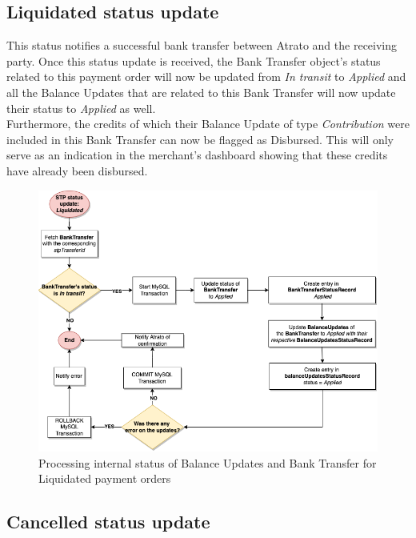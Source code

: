 \subsection{Liquidated status update}

This status notifies a successful bank transfer between Atrato and the receiving party. Once this status update is received, the Bank Transfer object’s status related to this payment order will now be updated from \textit{In transit} to \textit{Applied} and all the Balance Updates that are related to this Bank Transfer will now update their status to \textit{Applied} as well.\\

Furthermore, the credits of which their Balance Update of type \textit{Contribution} were included in this Bank Transfer can now be flagged as Disbursed. This will only serve as an indication in the merchant’s dashboard showing that these credits have already been disbursed.

\begin{figure} [H]
    \centering
    \includegraphics[scale = 0.4]{assets/diagrams/LiquidatedStatusUpdate.png}
    \caption{Processing internal status of Balance Updates and Bank Transfer for Liquidated payment orders}\label{fig:liquidated_status_update}
\end{figure}

\subsection{Cancelled status update}

